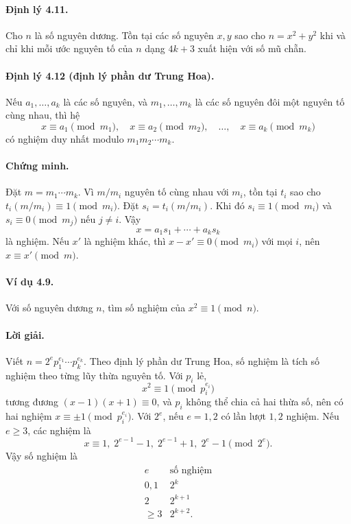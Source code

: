 \documentclass[11pt]{article}
\begin{document}
\paragraph{Định lý 4.11.}
Cho \(n\) là số nguyên dương. Tồn tại các số nguyên \(x,y\) sao cho
\(n=x^2+y^2\) khi và chỉ khi mỗi ước nguyên tố của \(n\) dạng \(4k+3\) xuất
hiện với số mũ chẵn.

\paragraph{Định lý 4.12 (định lý phần dư Trung Hoa).}
Nếu \(a_1,\ldots,a_k\) là các số nguyên, và \(m_1,\ldots,m_k\) là các số
nguyên đôi một nguyên tố cùng nhau, thì hệ
\[
 x\equiv a_1\pmod{m_1},\quad
 x\equiv a_2\pmod{m_2},\quad\ldots,\quad
 x\equiv a_k\pmod{m_k}
\]
có nghiệm duy nhất modulo \(m_1m_2\cdots m_k\).

\paragraph{Chứng minh.}
Đặt \(m=m_1\cdots m_k\). Vì \(m/m_i\) nguyên tố cùng nhau với \(m_i\), tồn tại
\(t_i\) sao cho \(t_i(m/m_i)\equiv1\pmod{m_i}\). Đặt
\(s_i=t_i(m/m_i)\). Khi đó \(s_i\equiv1\pmod{m_i}\) và
\(s_i\equiv0\pmod{m_j}\) nếu \(j\ne i\). Vậy
\[
 x=a_1s_1+\cdots+a_ks_k
\]
là nghiệm. Nếu \(x'\) là nghiệm khác, thì \(x-x'\equiv0\pmod{m_i}\) với mọi
\(i\), nên \(x\equiv x'\pmod m\).

\paragraph{Ví dụ 4.9.}
Với số nguyên dương \(n\), tìm số nghiệm của \(x^2\equiv1\pmod n\).

\paragraph{Lời giải.}
Viết \(n=2^e p_1^{e_1}\cdots p_k^{e_k}\). Theo định lý phần dư Trung Hoa, số
nghiệm là tích số nghiệm theo từng lũy thừa nguyên tố. Với \(p_i\) lẻ,
\[
 x^2\equiv1\pmod{p_i^{e_i}}
\]
tương đương \((x-1)(x+1)\equiv0\), và \(p_i\) không thể chia cả hai thừa số,
nên có hai nghiệm \(x\equiv\pm1\pmod{p_i^{e_i}}\). Với \(2^e\), nếu \(e=1,2\)
có lần lượt \(1,2\) nghiệm. Nếu \(e\ge3\), các nghiệm là
\[
 x\equiv1,\;2^{e-1}-1,\;2^{e-1}+1,\;2^e-1\pmod{2^e}.
\]
Vậy số nghiệm là
\[
\begin{array}{c|c}
e&\text{số nghiệm}\\ \hline
0,1&2^k\\
2&2^{k+1}\\
\ge3&2^{k+2}.
\end{array}
\]
\end{document}
